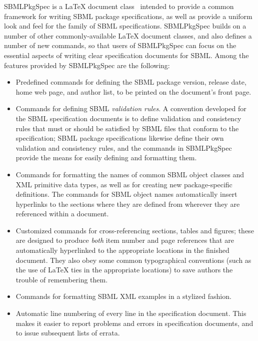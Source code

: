 \documentclass{bmcart}
\newcommand{\sbmlpkg}{SBMLPkgSpec}
\begin{document}
\sbmlpkg{} is a LaTeX document class~\cite{lamport1994} intended to provide a common framework for writing SBML package specifications, as well as provide a uniform look and feel for the family of SBML specifications.  \sbmlpkg{} builds on a number of other commonly-available LaTeX document classes, and also defines a number of new commands, so that users of \sbmlpkg{} can focus on the essential aspects of writing clear specification documents for SBML.  Among the features provided by \sbmlpkg{} are the following:

\begin{itemize}

\item Predefined commands for defining the SBML package version, release date, home web page, and author list, to be printed on the document's front page.

\item Commands for defining SBML \emph{validation rules}.  A convention developed for the SBML specification documents is to define validation and consistency rules that must or should be satisfied by SBML files that conform to the specification; SBML package specifications likewise define their own validation and consistency rules, and the commands in \sbmlpkg{} provide the means for easily defining and formatting them.

\item Commands for formatting the names of common SBML object classes and XML primitive data types, as well as for creating new package-specific definitions.  The commands for SBML object names automatically insert hyperlinks to the sections where they are defined from wherever they are  referenced within a document.

\item Customized commands for cross-referencing sections, tables and figures; these are designed to produce \emph{both} item number and page references that are automatically hyperlinked to the appropriate locations in the finished document. They also obey some common typographical conventions (such as the use of LaTeX ties in the appropriate locations) to save authors the trouble of remembering them.

\item Commands for formatting SBML XML examples in a stylized fashion.

\item Automatic line numbering of every line in the specification document. This makes it easier to report problems and errors in specification documents, and to issue subsequent lists of errata.


\end{itemize}
\end{document}
